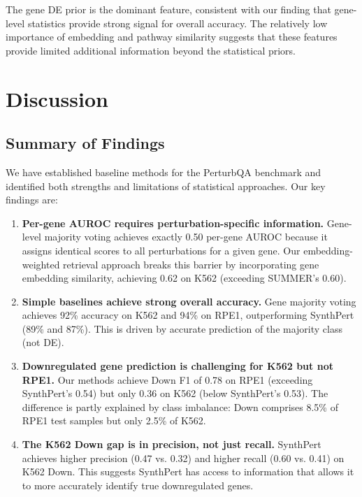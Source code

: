 \documentclass[11pt]{article}
\begin{document}
The gene DE prior is the dominant feature, consistent with our finding that gene-level statistics provide strong signal for overall accuracy. The relatively low importance of embedding and pathway similarity suggests that these features provide limited additional information beyond the statistical priors.

\section{Discussion}

\subsection{Summary of Findings}

We have established baseline methods for the PerturbQA benchmark and identified both strengths and limitations of statistical approaches. Our key findings are:

\begin{enumerate}
    \item \textbf{Per-gene AUROC requires perturbation-specific information.} Gene-level majority voting achieves exactly 0.50 per-gene AUROC because it assigns identical scores to all perturbations for a given gene. Our embedding-weighted retrieval approach breaks this barrier by incorporating gene embedding similarity, achieving 0.62 on K562 (exceeding SUMMER's 0.60).

    \item \textbf{Simple baselines achieve strong overall accuracy.} Gene majority voting achieves 92\% accuracy on K562 and 94\% on RPE1, outperforming SynthPert (89\% and 87\%). This is driven by accurate prediction of the majority class (not DE).

    \item \textbf{Downregulated gene prediction is challenging for K562 but not RPE1.} Our methods achieve Down F1 of 0.78 on RPE1 (exceeding SynthPert's 0.54) but only 0.36 on K562 (below SynthPert's 0.53). The difference is partly explained by class imbalance: Down comprises 8.5\% of RPE1 test samples but only 2.5\% of K562.

    \item \textbf{The K562 Down gap is in precision, not just recall.} SynthPert achieves higher precision (0.47 vs. 0.32) and higher recall (0.60 vs. 0.41) on K562 Down. This suggests SynthPert has access to information that allows it to more accurately identify true downregulated genes.
\end{enumerate}
\end{document}
